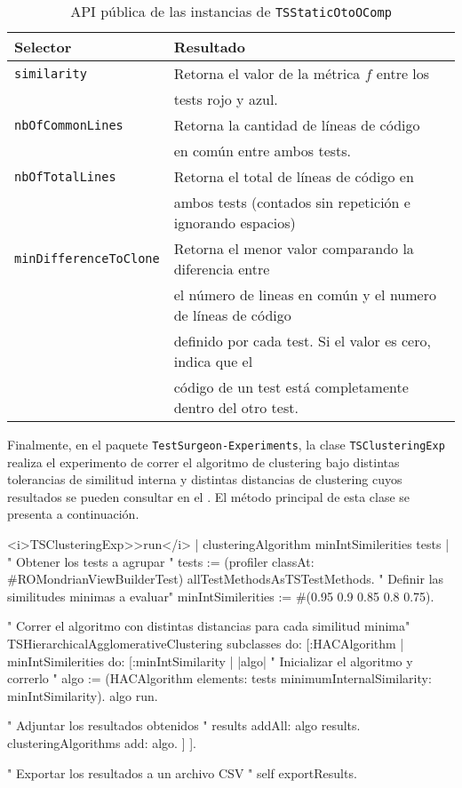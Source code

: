 \begin{table}[h] 
    \centering 
    \begin{tabular}{|l|l|}
    	\hline
\textbf{Selector} & \textbf{Resultado} \\ \hline \hline

{\tt similarity} & Retorna el valor de la métrica $f$ entre los \\
				 & tests rojo y azul. \\ \hline	
{\tt nbOfCommonLines } & Retorna la cantidad de líneas de código \\
				 & en común entre ambos tests.\\ \hline
{\tt nbOfTotalLines} & Retorna el total de líneas de código en \\
				 & ambos tests (contados sin repetición e ignorando espacios)\\ \hline
{\tt minDifferenceToClone}	& Retorna el menor valor comparando la diferencia entre \\
				 & el número de lineas en común y el numero de líneas de código \\
				 & definido por cada test. Si el valor es cero, indica que el \\
				 & código de un test está completamente dentro del otro test.\\ \hline 
    \end{tabular}
    \caption{API pública de las instancias de {\tt TSStaticOtoOComp}}
\end{table} 

\clearpage
\par Finalmente, en el paquete {\tt TestSurgeon-Experiments}, la clase {\tt TSClusteringExp} realiza el experimento de correr el algoritmo de clustering bajo distintas tolerancias de similitud interna y distintas distancias de clustering cuyos resultados se pueden consultar en el . El método principal de esta clase se presenta a continuación.

\begin{codeWithLineNumbers}
<i>TSClusteringExp>>run</i>
	| clusteringAlgorithm minIntSimilerities tests |
	" Obtener los tests a agrupar "
	tests := (profiler classAt: #ROMondrianViewBuilderTest) allTestMethodsAsTSTestMethods.
	" Definir las similitudes minimas a evaluar" 
	minIntSimilerities := #(0.95 0.9 0.85 0.8 0.75).
	
	" Correr el algoritmo con distintas distancias para cada similitud minima"
	TSHierarchicalAgglomerativeClustering subclasses do: [:HACAlgorithm |
		minIntSimilerities do: [:minIntSimilarity |
			|algo|
			" Inicializar el algoritmo y correrlo "
			algo := (HACAlgorithm 	
							elements: tests
			  				minimumInternalSimilarity: minIntSimilarity).
			algo run.
			
			" Adjuntar los resultados obtenidos "
			results addAll: algo results.
			clusteringAlgorithms add: algo.
		]
	].
	
	" Exportar los resultados a un archivo CSV "
	self exportResults.
\end{codeWithLineNumbers}


